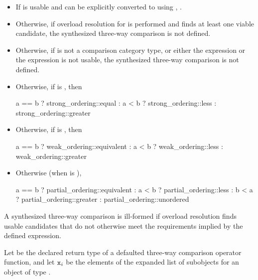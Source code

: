 \begin{itemize}
\item
If  is usable and
can be explicitly converted to  using ,
.

\item
Otherwise, if overload resolution for  is performed and
finds at least one viable candidate,
the synthesized three-way comparison is not defined.

\item
Otherwise, if  is not a comparison category type, or either
the expression  or the expression 
is not usable,
the synthesized three-way comparison is not defined.

\item
Otherwise, if  is , then
\begin{codeblock}
a == b ? strong_ordering::equal :
a < b  ? strong_ordering::less :
         strong_ordering::greater
\end{codeblock}

\item
Otherwise, if  is , then
\begin{codeblock}
a == b ? weak_ordering::equivalent :
a < b  ? weak_ordering::less :
         weak_ordering::greater
\end{codeblock}

\item
Otherwise (when  is ),
\begin{codeblock}
a == b ? partial_ordering::equivalent :
a < b  ? partial_ordering::less :
b < a  ? partial_ordering::greater :
         partial_ordering::unordered
\end{codeblock}
\end{itemize}

\begin{note}
A synthesized three-way comparison is ill-formed
if overload resolution finds usable candidates
that do not otherwise meet the requirements implied by the defined expression.
\end{note}

\pnum
Let  be the declared return type of
a defaulted three-way comparison operator function, and
let $\texttt{\protect x}_i$ be the elements of
the expanded list of subobjects for
an object  of type .

